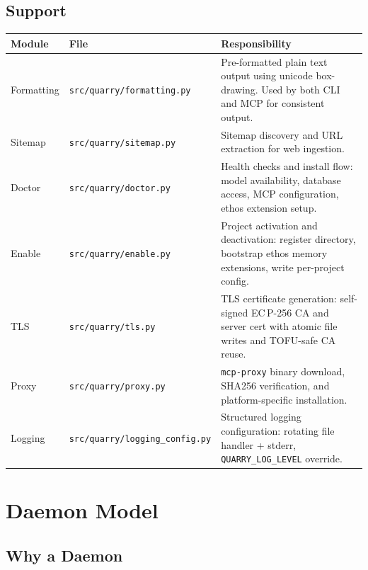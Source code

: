 \documentclass[a4paper,10pt]{article}
\newcommand{\modpath}[1]{\texttt{src/quarry/#1}}
\begin{document}
\subsection{Support}

\begin{center}
\begin{tabular}{llp{7cm}}
\toprule
\textbf{Module} & \textbf{File} & \textbf{Responsibility} \\
\midrule
Formatting & \modpath{formatting.py} & Pre-formatted plain text
             output using unicode box-drawing.  Used by both CLI
             and MCP for consistent output. \\
Sitemap    & \modpath{sitemap.py}    & Sitemap discovery and URL
             extraction for web ingestion. \\
Doctor     & \modpath{doctor.py}     & Health checks and install flow:
             model availability, database access, MCP
             configuration, ethos extension setup. \\
Enable     & \modpath{enable.py}     & Project activation and
             deactivation: register directory, bootstrap ethos
             memory extensions, write per-project config. \\
TLS        & \modpath{tls.py}        & TLS certificate generation:
             self-signed EC\,P-256 CA and server cert with
             atomic file writes and TOFU-safe CA reuse. \\
Proxy      & \modpath{proxy.py}      & \texttt{mcp-proxy} binary
             download, SHA256 verification, and
             platform-specific installation. \\
Logging    & \modpath{logging\_config.py} & Structured logging
             configuration: rotating file handler + stderr,
             \texttt{QUARRY\_LOG\_LEVEL} override. \\
\bottomrule
\end{tabular}
\end{center}

\section{Daemon Model}

\subsection{Why a Daemon}
\end{document}

